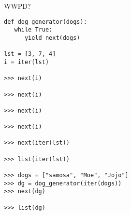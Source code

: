 \begin{blocksection}
\question WWPD?
\begin{lstlisting}
def dog_generator(dogs):
   while True:
      yield next(dogs)
 
lst = [3, 7, 4]
i = iter(lst)

>>> next(i)

>>> next(i)

>>> next(i)

>>> next(i)

>>> next(iter(lst))

>>> list(iter(lst))

>>> dogs = ["samosa", "Moe", "Jojo"]
>>> dg = dog_generator(iter(dogs))
>>> next(dg)

>>> list(dg)

\end{lstlisting}
\end{blocksection}